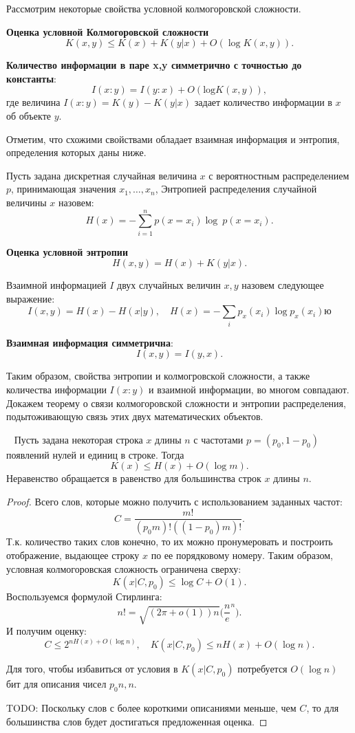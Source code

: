 \documentclass[../main.tex]{subfiles}
\begin{document}
Рассмотрим некоторые свойства условной колмогоровской сложности.


\textbf{Оценка условной Колмогоровской сложности}~\cite{kolmogorov}
\[
	K(x,y) \leq K(x) + K(y|x) + O(\log K(x,y)).
\]


\textbf{Количество информации в паре x,y симметрично с точностью до константы}:
\[
I(x:y) = I(y:x) + O(\text{log}K(x,y)),
\]
где величина $I(x:y) = K(y) - K(y|x)$  задает количество информации в $x$ об объекте $y$. 

Отметим, что схожими свойствами обладает взаимная информация и энтропия, определения которых даны ниже.

\begin{definition}
Пусть задана дискретная случайная величина $x$ с вероятностным распределением $p$, принимающая значения $x_1, \dots, x_n$,
Энтропией распределения случайной величины $x$ назовем:
\[
	H(x) = -\sum_{i=1}^n p(x = x_i) \log~p(x = x_i).
\]
\end{definition}
\textbf{Оценка условной энтропии}
\[
	H(x,y) = H(x) + K(y|x).
\]
\begin{definition}
Взаимной информацией $I$ двух случайных величин $x,y$ назовем следующее выражение:
\[
	I(x,y) = H(x) - H(x|y), \quad H(x) = - \sum_{i} p_x(x_i) \log p_x(x_i)ю
\]
\end{definition}
\textbf{Взаимная информация симметрична}:
\[
I(x,y) = I(y,x).
\]

Таким образом, свойства энтропии и колмогровской сложности, а также количества информации $I(x:y)$ и взаимной информации, во многом совпадают. Докажем теорему о связи колмогоровской сложности и энтропии распределения, подытоживающую связь этих двух математических объектов.

\begin{theorem}~\cite{kolmogorov}
Пусть задана некоторая строка $x$ длины $n$ с частотами  $p = (p_0, 1 - p_0)$ появлений нулей и единиц в строке.
Тогда
\[
K(x) \leq H(x) + O(\log m).
\]
Неравенство обращается в равенство для большинства строк $x$ длины $n$.
\end{theorem}
\begin{proof}
Всего слов, которые можно получить с использованием заданных частот:
\[
    C = \frac{m!}{(p_0 m)! ((1-p_0)m)! }.
\]
Т.к. количество таких слов конечно, то их можно пронумеровать и построить отображение, выдающее строку $x$ по ее порядковому номеру.
Таким образом, условная колмогоровская сложность ограничена сверху:
\[
K(x|C, p_0) \leq \log C + O(1).
\]
Воспользуемся формулой Стирлинга:
\[
    n! = \sqrt{(2\pi + o(1))n}\bigl(\frac{n}{e}^n\bigr).
\]
И получим оценку:
\[
    C \leq 2^{nH(x) + O(\log n)}, \quad K(x|C, p_0) \leq  nH(x) + O(\log n).
\]

Для того, чтобы избавиться от условия в $K(x|C, p_0)$  потребуется $O(\log n)$ бит для описания чисел $p_0n, n$.

TODO: Поскольку слов с более короткими описаниями меньше, чем $C$, то для большинства слов будет достигаться предложенная оценка.
\end{proof}
\end{document}
